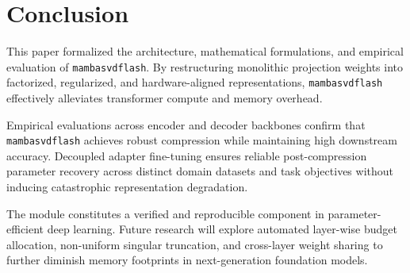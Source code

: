 \section{Conclusion}
This paper formalized the architecture, mathematical formulations, and empirical evaluation of \texttt{mambasvdflash}. By restructuring monolithic projection weights into factorized, regularized, and hardware-aligned representations, \texttt{mambasvdflash} effectively alleviates transformer compute and memory overhead.

Empirical evaluations across encoder and decoder backbones confirm that \texttt{mambasvdflash} achieves robust compression while maintaining high downstream accuracy. Decoupled adapter fine-tuning ensures reliable post-compression parameter recovery across distinct domain datasets and task objectives without inducing catastrophic representation degradation.

The module constitutes a verified and reproducible component in parameter-efficient deep learning. Future research will explore automated layer-wise budget allocation, non-uniform singular truncation, and cross-layer weight sharing to further diminish memory footprints in next-generation foundation models.
